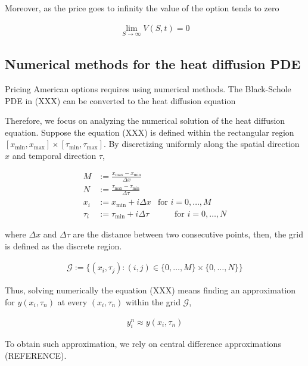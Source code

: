 Moreover, as the price goes to infinity the value of the option tends to zero

\begin{align}
  \lim_{S \rightarrow \infty}V(S, t) = 0 
  \label{eq:background:finance:american_option_stopping_right_boundary}
\end{align}


\subsection{Numerical methods for the heat diffusion PDE}

Pricing American options requires using numerical methods. The Black-Schole PDE 
in (XXX) can be converted to the heat diffusion equation


Therefore, we focus on analyzing the numerical solution of the heat diffusion equation. 
Suppose the equation (XXX) is defined within the rectangular region $[x_{\text{min}}, x_{\text{max}}]\times[\tau_{\text{min}}, \tau_{\text{max}}]$.
By discretizing uniformly along the spatial direction $x$ and temporal direction $\tau$,

\begin{align}
  M &:= \frac{x_{\text{max}} - x_{\text{min}}}{\Delta x} \\ 
  N &:= \frac{\tau_{\text{max}} - \tau_{\text{min}}}{\Delta \tau} \\ 
  x_i &:= x_{\text{min}} + i\Delta x & \text{for $i = 0,\dots, M$} \\
  \tau_i &:= \tau_{\text{min}} + i{\Delta \tau} & \qquad \text{for $i = 0,\dots, N$}
\end{align}

where $\Delta x$ and $\Delta \tau$ are the distance between two consecutive points,
then, the grid is defined as the discrete region. 

\begin{align}
  \mathcal{G} := \{(x_i, \tau_j): (i, j) \in \{0,\dots,M\}\times\{0,\dots,N\}\}
\end{align}

Thus, solving numerically the equation (XXX) means finding an approximation for $y(x_i, \tau_n)$ at every 
$(x_i, \tau_n)$ within the grid $\mathcal{G}$,

\begin{align}
  y^{n}_i \approx y(x_i,\tau_n)
\end{align}

To obtain such approximation, we rely on central difference approximations (REFERENCE).

